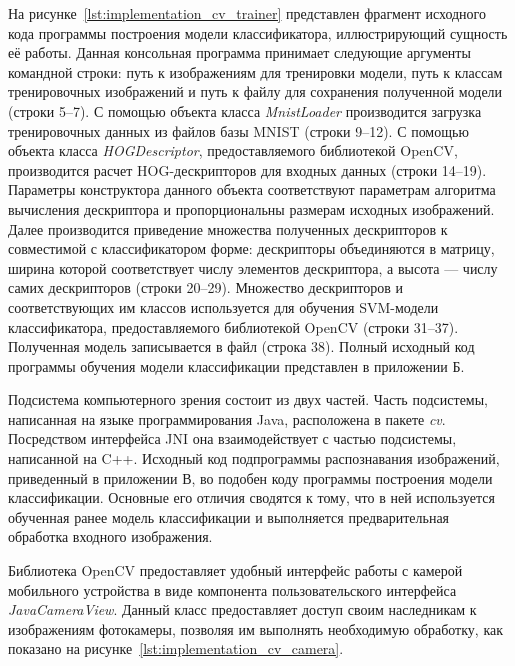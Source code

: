 На рисунке~\ref{lst:implementation_cv_trainer} представлен фрагмент
исходного кода программы построения модели классификатора,
иллюстрирующий сущность её работы.
Данная консольная программа принимает следующие аргументы командной
строки: путь к изображениям для тренировки модели,
путь к классам тренировочных изображений и
путь к файлу для сохранения полученной модели (строки 5--7).
С помощью объекта класса \textit{MnistLoader} производится загрузка
тренировочных данных из файлов базы MNIST (строки 9--12).
С помощью объекта класса \textit{HOGDescriptor}, предоставляемого
библиотекой OpenCV, производится расчет HOG-дескрипторов для
входных данных (строки 14--19). Параметры конструктора данного объекта
соответствуют параметрам алгоритма вычисления дескриптора
и пропорциональны размерам исходных изображений.
Далее производится приведение множества полученных дескрипторов
к совместимой с классификатором форме:
дескрипторы объединяются в матрицу, ширина которой
соответствует числу элементов дескриптора, а высота ---
числу самих дескрипторов (строки 20--29).
Множество дескрипторов и соответствующих им классов используется
для обучения SVM-модели классификатора, предоставляемого библиотекой
OpenCV (строки 31--37).
Полученная модель записывается в файл (строка 38).
Полный исходный код программы обучения модели классификации представлен
в приложении Б.



Подсистема компьютерного зрения состоит из двух частей.
Часть подсистемы, написанная на языке
программирования Java, расположена в пакете \textit{cv}. Посредством
интерфейса JNI она взаимодействует с частью подсистемы, написанной на C++.
Исходный код подпрограммы распознавания изображений, приведенный в приложении В,
во подобен коду программы построения модели классификации.
Основные его отличия сводятся к тому,
что в ней используется обученная ранее модель классификации и
выполняется предварительная обработка входного изображения.

Библиотека OpenCV предоставляет удобный интерфейс работы с камерой
мобильного устройства в виде компонента пользовательского интерфейса
\textit{JavaCameraView}.
Данный класс предоставляет доступ своим наследникам
к изображениям фотокамеры, позволяя им выполнять
необходимую обработку, как показано на рисунке~\ref{lst:implementation_cv_camera}.



